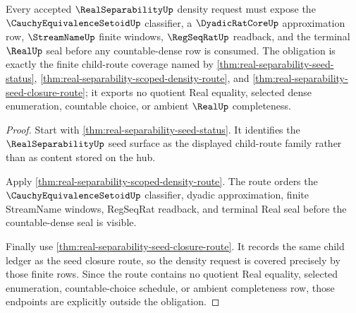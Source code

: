 \begin{theorem}
\label{thm:real-separability-cauchy-setoid-dyadic-density-obligation}
Every accepted $\RealSeparabilityUp$ density request must expose the $\CauchyEquivalenceSetoidUp$ classifier, a $\DyadicRatCoreUp$ approximation row, $\StreamNameUp$ finite windows, $\RegSeqRatUp$ readback, and the terminal $\RealUp$ seal before any countable-dense row is consumed. The obligation is exactly the finite child-route coverage named by \autoref{thm:real-separability-seed-status}, \autoref{thm:real-separability-scoped-density-route}, and \autoref{thm:real-separability-seed-closure-route}; it exports no quotient Real equality, selected dense enumeration, countable choice, or ambient $\RealUp$ completeness.
\end{theorem}
\begin{proof}
Start with \autoref{thm:real-separability-seed-status}. It identifies the $\RealSeparabilityUp$ seed surface as the displayed child-route family rather than as content stored on the hub.

Apply \autoref{thm:real-separability-scoped-density-route}. The route orders the $\CauchyEquivalenceSetoidUp$ classifier, dyadic approximation, finite StreamName windows, RegSeqRat readback, and terminal Real seal before the countable-dense seal is visible.

Finally use \autoref{thm:real-separability-seed-closure-route}. It records the same child ledger as the seed closure route, so the density request is covered precisely by those finite rows. Since the route contains no quotient Real equality, selected enumeration, countable-choice schedule, or ambient completeness row, those endpoints are explicitly outside the obligation.
\end{proof}

